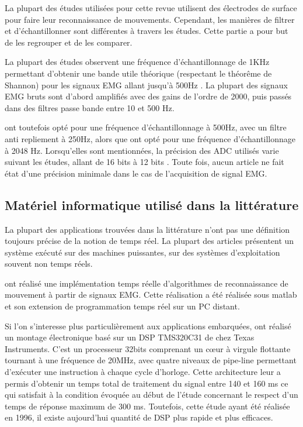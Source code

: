 \documentclass[letterpaper, twoside, 12pt, memoire, creativecommons, hyperref]{thETS}
\begin{document}
La plupart des études utilisées pour cette revue utilisent des électrodes de surface pour faire leur reconnaissance de mouvements. Cependant, les manières de filtrer et d'échantillonner sont différentes à travers les études. Cette partie a pour but de les regrouper et de les comparer. 

La plupart des études observent une fréquence d’échantillonnage de 1KHz permettant d’obtenir une bande utile théorique (respectant le théorême de Shannon) pour les signaux EMG allant jusqu’à 500Hz \citep{Chang1996, Chu2007, Englehart2003, Tenore2007}. 
La plupart des signaux EMG bruts sont d'abord amplifiés avec des gains de l’ordre de 2000, puis passés dans des filtres passe bande entre 10 et 500 Hz.

\cite{Peleg2002} ont toutefois opté pour une fréquence d’échantillonnage à 500Hz, avec un filtre anti repliement à 250Hz, alors que \cite{Crawford2005} ont opté pour une fréquence d’échantillonnage à 2048 Hz.
Lorsqu’elles sont mentionnées, la précision des ADC utilisés varie suivant les études, allant de 16 bits \citep{Englehart2003} à 12 bits \citep{Tenore2007, Fukuda2003, Prasad1996}. Toute fois, aucun article ne fait état d'une précision minimale dans le cas de l'acquisition de signal EMG.


\subsection{Matériel informatique utilisé dans la littérature}

La plupart des applications trouvées dans la littérature n'ont pas une définition toujours précise de la notion de temps réel. La plupart des articles présentent un système exécuté sur des machines puissantes, sur des systèmes d'exploitation souvent non temps réels. 

\cite{Englehart2003} ont réalisé une implémentation temps réelle d’algorithmes de reconnaissance de mouvement à partir de signaux EMG. Cette réalisation a été réalisée sous matlab et son extension de programmation temps réel sur un PC distant.

Si l'on s'interesse plus particulièrement aux applications embarquées, \cite{Chang1996} ont réalisé un montage électronique basé sur un DSP TMS320C31 de chez Texas Instruments. C’est un processeur 32bits comprenant un cœur à virgule flottante tournant à une fréquence de 20MHz, avec quatre niveaux de pipe-line permettant d’exécuter une instruction à chaque cycle d’horloge. Cette architecture leur a permis d’obtenir un temps total de traitement du signal entre 140 et 160 ms ce qui satisfait à la condition évoquée au début de l’étude concernant le respect d’un temps de réponse maximum de 300 ms. Toutefois, cette étude ayant été réalisée en 1996, il existe aujourd’hui quantité de DSP plus rapide et plus efficaces.
\end{document}
